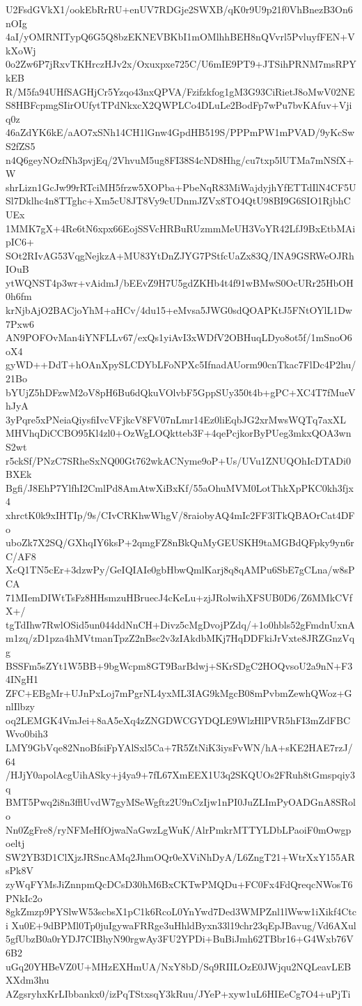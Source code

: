 U2FsdGVkX1/ookEbRrRU+enUV7RDGje2SWXB/qK0r9U9p21f0VhBnezB3On6nOIg
4aI/yOMRNITypQ6G5Q8bzEKNEVBKbI1mOMlhhBEH8nQVvrl5PvluyfFEN+VkXoWj
0o2Zw6P7jRxvTKHrczHJv2x/Oxuxpxe725C/U6mIE9PT9+JTSihPRNM7msRPYkEB
R/M5fa94UHfSAGHjCr5Yzqo43nxQPVA/Fzifzkfog1gM3G93CiRietJ8oMwV02NE
S8HBFcpmgSIirOUfytTPdNkxcX2QWPLCo4DLuLe2BodFp7wPu7bvKAfuv+Vjiq0z
46aZdYK6kE/aAO7xSNh14CH1lGnw4GpdHB519S/PPPmPW1mPVAD/9yKcSwS2fZS5
n4Q6geyNOzfNh3pvjEq/2VhvuM5ug8FI38S4cND8Hhg/cu7txp5lUTMa7mNSfX+W
shrLizn1GcJw99rRTciMH5frzw5XOPba+PbeNqR83MiWajdyjhYfETTdIlN4CF5U
Sl7Dklhc4n8TTghc+Xm5cU8JT8Vy9cUDnmJZVx8TO4QtU98BI9G6SIO1RjbhCUEx
1MMK7gX+4Re6tN6xpx66EojSSVcHRBuRUzmmMeUH3VoYR42LfJ9BxEtbMAipIC6+
SOt2RIvAG53VqgNejkzA+MU83YtDnZJYG7PStfcUaZx83Q/INA9GSRWeOJRhIOuB
ytWQNST4p3wr+vAidmJ/bEEvZ9H7U5gdZKHb4t4f91wBMwS0OcURr25HbOH0h6fm
krNjbAjO2BACjoYhM+aHCv/4du15+eMvsa5JWG0sdQOAPKtJ5FNtOYlL1Dw7Pxw6
AN9POFOvMan4iYNFLLv67/exQs1yiAvI3xWDfV2OBHuqLDyo8ot5f/1mSnoO6oX4
gyWD++DdT+hOAnXpySLCDYbLFoNPXc5IfnadAUorm90cnTkac7FlDc4P2hu/21Bo
bYUjZ5hDFzwM2oV8pH6Bu6dQkuVOlvbF5GppSUy350t4b+gPC+XC4T7fMueVhJyA
3yPqre5xPNeiaQiysfiIvcVFjkcV8FV07nLmr14Ez0liEqbJG2xrMwsWQTq7axXL
MHVhqDiCCBO95Kl4zl0+OzWgLOQktteb3F+4qePcjkorByPUeg3mkxQOA3wnS2wt
r5ckSf/PNzC7SRheSxNQ00Gt762wkACNyme9oP+Us/UVu1ZNUQOhIcDTADi0BXEk
Bgfi/J8EhP7YlfhI2CmlPd8AmAtwXiBxKf/55aOhuMVM0LotThkXpPKC0kh3fjx4
xhrctK0k9xIHTIp/9s/CIvCRKhwWhgV/8raiobyAQ4mIc2FF3lTkQBAOrCat4DFo
uboZk7X2SQ/GXhqIY6ksP+2qmgFZ8nBkQuMyGEUSKH9taMGBdQFpky9yn6rC/AF8
XcQ1TN5cEr+3dzwPy/GeIQIAIe0gbHbwQmlKarj8q8qAMPu6SbE7gCLna/w8sPCA
71MIemDIWtTsFz8HHsmzuHBruecJ4cKeLu+zjJRolwihXFSUB0D6/Z6MMkCVfX+/
tgTdIhw7RwlOSid5un044ddNnCH+Divz5cMgDvojPZdq/+1o0hbls52gFmdnUxnA
m1zq/zD1pza4hMVtmanTpzZ2nBsc2v3zIAkdbMKj7HqDDFkiJrVxte8JRZGnzVqg
BSSFm5sZYt1W5BB+9bgWcpm8GT9BarBdwj+SKrSDgC2HOQvsoU2a9nN+F34INgH1
ZFC+EBgMr+UJnPxLoj7mPgrNL4yxML3IAG9kMgcB08mPvbmZewhQWoz+GnlIlbzy
oq2LEMGK4VmJei+8aA5eXq4zZNGDWCGYDQLE9WlzHlPVR5hFI3mZdFBCWvo0bih3
LMY9GbVqe82NnoBfsiFpYAlSxl5Ca+7R5ZtNiK3iysFvWN/hA+sKE2HAE7rzJ/64
/HJjY0apolAcgUihASky+j4ya9+7fL67XmEEX1U3q2SKQUOs2FRuh8tGmspqiy3q
BMT5Pwq2i8n3fflUvdW7gyMSeWgftz2U9nCzIjw1nPI0JuZLImPyOADGnA8SRolo
Nn0ZgFre8/ryNFMeHfOjwaNaGwzLgWuK/AlrPmkrMTTYLDbLPaoiF0mOwgpoeltj
SW2YB3D1ClXjzJRSncAMq2JhmOQr0eXViNhDyA/L6ZngT21+WtrXxY155ARsPk8V
zyWqFYMsJiZnnpmQcDCsD30hM6BxCKTwPMQDu+FC0Fx4FdQreqcNWosT6PNkIc2o
8gkZmzp9PYSlwW53scbsX1pC1k6RcoL0YnYwd7Ded3WMPZnl1lWww1iXikf4Ctci
Xu0E+9dBPMl0Tp0juIgywaFRRge3uHhldByxn33l19chr23qEpJBavug/Vd6AXul
5gfUbzB0a0rYDJ7CIBhyN90rgwAy3FU2YPDi+BuBiJmh62TBbr16+G4Wxb76V6B2
uGq20YHBeVZ0U+MHzEXHmUA/NxY8bD/Sq9RIILOzE0JWjqu2NQLeavLEBXXdm3hu
AZgsryhxKrLIbbankx0/izPqTStxsqY3kRuu/JYeP+xyw1uL6HIEeCg7O4+uPjTi
